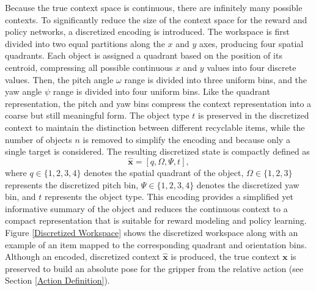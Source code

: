 \documentclass[./dissertation.tex]{subfiles}
\begin{document}
Because the true context space is continuous, there are infinitely many possible contexts. To significantly reduce the size of the context space for the reward and policy networks, a discretized encoding is introduced. The workspace is first divided into two equal partitions along the $x$ and $y$ axes, producing four spatial quadrants. Each object is assigned a quadrant based on the position of its centroid, compressing all possible continuous $x$ and $y$ values into four discrete values. Then, the pitch angle $\omega$ range is divided into three uniform bins, and the yaw angle $\psi$ range is divided into four uniform bins. Like the quadrant representation, the pitch and yaw bins compress the context representation into a coarse but still meaningful form. The object type $t$ is preserved in the discretized context to maintain the distinction between different recyclable items, while the number of objects $n$ is removed to simplify the encoding and because only a single target is considered. The resulting discretized state is compactly defined as
\[
\mathbf{\hat{x}} = [q, \Omega, \Psi, t],
\]
where $q \in \{ 1,2,3,4 \}$ denotes the spatial quadrant of the object, $\Omega \in \{ 1,2,3 \}$ represents the discretized pitch bin, $\Psi \in \{ 1,2,3,4 \}$ denotes the discretized yaw bin, and $t$ represents the object type. This encoding provides a simplified yet informative summary of the object and reduces the continuous context to a compact representation that is suitable for reward modeling and policy learning. Figure \ref{Discretized Workspace} shows the discretized workspace along with an example of an item mapped to the corresponding quadrant and orientation bins. Although an encoded, discretized context $\mathbf{\hat{x}}$ is produced, the true context $\mathbf{x}$ is preserved to build an absolute pose for the gripper from the relative action (see Section \ref{Action Definition}).
\end{document}
